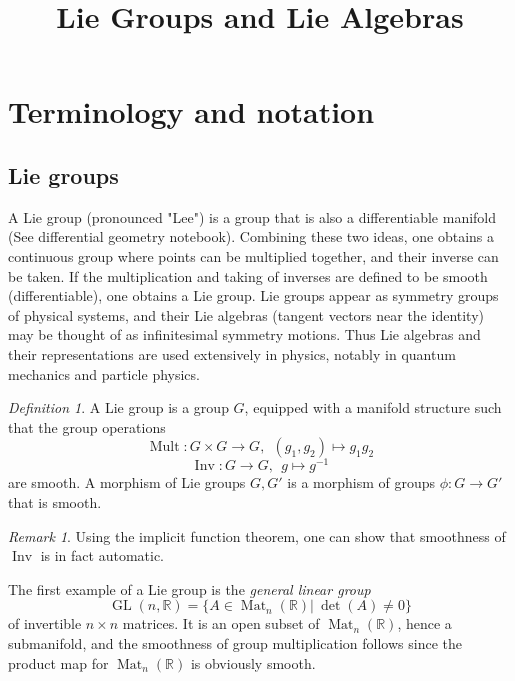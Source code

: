 \documentclass{article}
\title{\vspace{-3cm}  Lie Groups and Lie Algebras}
\author{}
\date{}
\theoremstyle{remark}
\newtheorem{remark}[theorem]{Remark}
\newtheorem{definition}[theorem]{Definition}
\newcommand{\R}{\mathbb{R}}
\newcommand{\on}{\operatorname}
\newcommand{\GL}{ \on{GL}}
\begin{document}
\maketitle
\vspace{-1.5cm}
\tableofcontents
\newpage


\section{Terminology and notation}
\subsection{Lie groups}
%

A Lie group (pronounced "Lee") is a group that is also a differentiable manifold (See differential geometry notebook). Combining these two ideas, one obtains a continuous group where points can be multiplied together, and their inverse can be taken. If the multiplication and taking of inverses are defined to be smooth (differentiable), one obtains a Lie group. Lie groups appear as symmetry groups of physical systems, and their Lie algebras (tangent vectors near the identity) may be thought of as infinitesimal symmetry motions. Thus Lie algebras and their representations are used extensively in physics, notably in quantum mechanics and particle physics.

\begin{definition}
A Lie group is a group $G$, equipped with a manifold structure such that the 
group operations 
\[ \on{Mult}\colon G\times G\to G,\ \ (g_1,g_2)\mapsto g_1 g_2\]
\[ \on{Inv}\colon G\to G,\ \ g\mapsto g^{-1}\]
are smooth. A morphism of Lie groups $G,G'$ is a morphism of groups
$\phi\colon G\to G'$ that is smooth.   
\end{definition}
%
\begin{remark}
Using the implicit function theorem, one can show that smoothness of $\on{Inv}$ is in fact automatic. 
\end{remark}

The first example of a Lie group is the \emph{general linear group}
\[ \GL(n,\R)=\{A\in \on{Mat}_n(\R)|\ \det(A)\not=0\}\]
of invertible  $n\times n$ matrices. It is an open subset of $\on{Mat}_n(\R)$, hence a submanifold, and the smoothness of group multiplication follows since the product map for $\on{Mat}_n(\R)$ is obviously smooth. 
\end{document}
